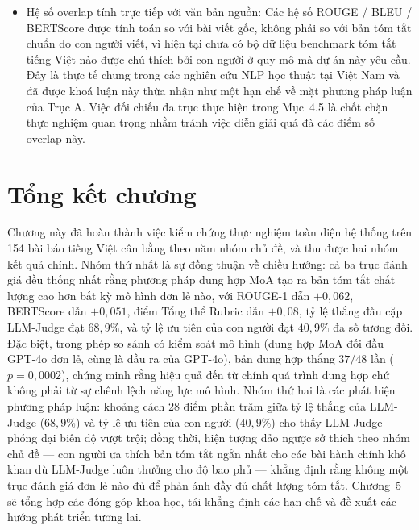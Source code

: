 \begin{itemize}
\item Hệ số overlap tính trực tiếp với văn bản nguồn: Các hệ số ROUGE / BLEU / BERTScore được tính toán so với bài viết gốc, không phải so với bản tóm tắt chuẩn do con người viết, vì hiện tại chưa có bộ dữ liệu benchmark tóm tắt tiếng Việt nào được chú thích bởi con người ở quy mô mà dự án này yêu cầu. Đây là thực tế chung trong các nghiên cứu NLP học thuật tại Việt Nam và đã được khoá luận này thừa nhận như một hạn chế về mặt phương pháp luận của Trục A. Việc đối chiếu đa trục thực hiện trong Mục~4.5 là chốt chặn thực nghiệm quan trọng nhằm tránh việc diễn giải quá đà các điểm số overlap này.
\end{itemize}

\section{Tổng kết chương}

Chương này đã hoàn thành việc kiểm chứng thực nghiệm toàn diện hệ thống trên 154 bài báo tiếng Việt cân bằng theo năm nhóm chủ đề, và thu được hai
nhóm kết quả chính. Nhóm thứ nhất là sự đồng thuận về chiều hướng: cả ba trục đánh giá đều thống nhất rằng phương pháp dung hợp MoA tạo ra bản tóm tắt chất lượng cao hơn bất kỳ mô hình đơn lẻ nào, với ROUGE-1 dẫn $+0{,}062$, BERTScore dẫn $+0{,}051$, điểm Tổng thể Rubric dẫn $+0{,}08$, tỷ lệ thắng đấu cặp LLM-Judge đạt $68{,}9\%$, và tỷ lệ ưu tiên của con người đạt $40{,}9\%$ đa số tương đối.
 Đặc biệt, trong phép so sánh có kiểm soát mô hình (dung hợp MoA đối đầu GPT-4o đơn lẻ, cùng là đầu ra của GPT-4o), bản dung hợp thắng $37/48$ lần ($p = 0{,}0002$), chứng minh rằng hiệu quả đến từ chính quá trình dung hợp chứ không phải từ sự chênh lệch năng lực mô hình. 
 Nhóm thứ hai là các phát hiện phương pháp luận: khoảng cách 28 điểm phần trăm giữa tỷ lệ thắng của LLM-Judge ($68{,}9\%$) và tỷ lệ ưu tiên của con người ($40{,}9\%$) cho thấy LLM-Judge phóng đại biên độ vượt trội; đồng thời, hiện tượng đảo ngược sở thích theo nhóm chủ đề --- con người ưa thích bản tóm tắt ngắn nhất cho các bài hành chính khô khan dù LLM-Judge luôn thưởng cho độ bao phủ --- khẳng định rằng không một trục đánh giá đơn lẻ nào đủ để phản ánh đầy đủ chất lượng tóm tắt. 
 Chương~5 sẽ tổng hợp các đóng góp khoa học, tái khẳng định các hạn chế và đề xuất các hướng phát triển tương lai.
